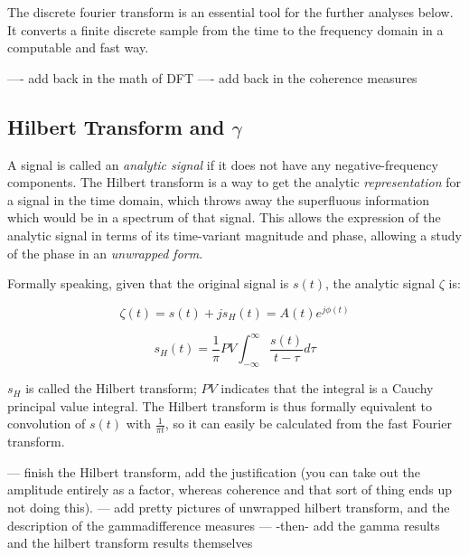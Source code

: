\documentclass[12pt]{article}
\begin{document}
The discrete fourier transform is an essential tool for the further analyses below. It converts a finite discrete sample from the time to the frequency domain in a computable and fast way.

---- add back in the math of DFT
---- add back in the coherence measures




\subsection{Hilbert Transform and $\gamma$}

A signal is called an \emph{analytic signal} if it does not have any negative-frequency components. The Hilbert transform is a way to get the analytic \emph{representation} for a signal in the time domain, which throws away the superfluous information which would be in a spectrum of that signal. This allows the expression of the analytic signal in terms of its time-variant magnitude and phase, allowing a study of the phase in an \emph{unwrapped form}\cite{gabor}.

Formally speaking, given that the original signal is $s(t)$, the analytic signal $\zeta$ is:

$$\zeta(t) = s(t) + js_H(t) = A(t)e^{j\phi(t)}$$

$$s_H(t) = \frac{1}{\pi} PV \int_{-\infty}^{\infty} \frac{s(t)}{t - \tau} d\tau$$

$s_H$ is called the Hilbert transform; $PV$ indicates that the integral is a Cauchy principal value integral. The Hilbert transform is thus formally equivalent to convolution of $s(t)$ with $\frac{1}{\pi t}$, so it can easily be calculated from the fast Fourier transform.

--- finish the Hilbert transform, add the justification (you can take out the amplitude entirely as a factor, whereas coherence and that sort of thing ends up not doing this).
--- add pretty pictures of unwrapped hilbert transform, and the description of the gammadifference measures
--- -then- add the gamma results and the hilbert transform results themselves
\end{document}
